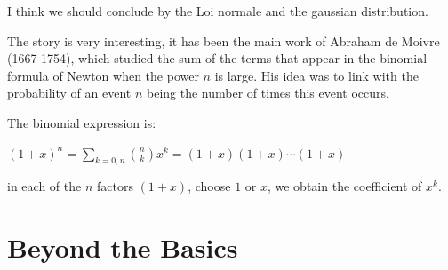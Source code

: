 \medskip

\noindent {}
\bigskip

{\Denis I think we should conclude by the Loi normale and the gaussian distribution. }

The story is very interesting, it has been the main work of Abraham de Moivre (1667-1754), 
which studied the sum of the terms that appear in the binomial formula of Newton when the power $n$ is large.
His idea was to link with the probability of an event $n$ being the number of times this event occurs.

The binomial expression is:

$(1+x)^n = \sum_{k=0,n} {n \choose k} x^k = (1+x)(1+x)\cdots(1+x)$

in each of the $n$ factors $(1+x)$, choose $1$ or $x$, we obtain the coefficient of $x^k$.

\medskip




\section{Beyond the Basics}

